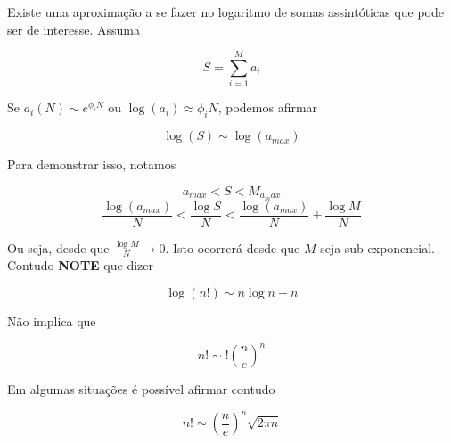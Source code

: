 Existe uma aproximação a se fazer no logaritmo de somas assintóticas que pode ser de interesse. Assuma

\[
	S = \sum_{i=1}^{M} a_i
\]  

Se $a_i(N) \sim e^{\phi_i N}$ ou $\log{(a_i)} \approx \phi_i N$, podemos afirmar

\[
	\log{(S)} \sim \log{(a_{max})}
\]

Para demonstrar isso, notamos

\[
	a_{max} < S < M_{a_max}
\]
\[
	\frac{\log{(a_{max})}}{N} < \frac{\log{S}}{N} < \frac{\log{(a_{max})}}{N} + \frac{\log{M}}{N}
\]

Ou seja, desde que $\frac{\log{M}}{N} \rightarrow 0$. Isto ocorrerá desde que $M$ seja sub-exponencial. Contudo \textbf{NOTE} que dizer

\[
	\log{(n!)} \sim n \log{n} - n
\]

Não implica que

\[
	n! \sim ! \left( \frac{n}{e}\right)^n 
\]

Em algumas situações é possível afirmar contudo

\[
	n! \sim \left( \frac{n}{e}\right)^n \sqrt{2\pi n}
\]